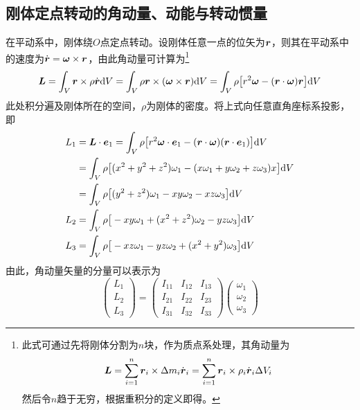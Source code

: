 \subsection{刚体定点转动的角动量、动能与转动惯量}

在平动系中，刚体绕$O$点定点转动。设刚体任意一点的位矢为$\boldsymbol{r}$，则其在平动系中的速度为$\dot{\boldsymbol{r}} = \boldsymbol{\omega} \times \boldsymbol{r}$，由此角动量可计算为\footnote{此式可通过先将刚体分割为$n$块，作为质点系处理，其角动量为\begin{equation*} \boldsymbol{L} = \sum_{i=1}^n \boldsymbol{r}_i \times \Delta m_i \dot{\boldsymbol{r}}_i = \sum_{i=1}^n \boldsymbol{r}_i \times \rho_i \dot{\boldsymbol{r}}_i \Delta V_i \end{equation*}然后令$n$趋于无穷，根据重积分的定义即得。}
\begin{align*}
	\boldsymbol{L} = \int_V \boldsymbol{r} \times \rho \dot{\boldsymbol{r}} \mathrm{d} V = \int_V \rho \boldsymbol{r} \times (\boldsymbol{\omega} \times \boldsymbol{r}) \mathrm{d} V = \int_V \rho \big[r^2 \boldsymbol{\omega} - (\boldsymbol{r} \cdot \boldsymbol{\omega}) \boldsymbol{r} \big] \mathrm{d} V
\end{align*}
此处积分遍及刚体所在的空间，$\rho$为刚体的密度。将上式向任意直角座标系投影，即
\begin{align*}
	L_1 & = \boldsymbol{L} \cdot \boldsymbol{e}_1 = \int_V \rho \big[r^2 \boldsymbol{\omega} \cdot \boldsymbol{e}_1 - (\boldsymbol{r} \cdot \boldsymbol{\omega}) (\boldsymbol{r} \cdot \boldsymbol{e}_1) \big] \mathrm{d} V \\
	& = \int_V \rho \big[(x^2+y^2+z^2) \omega_1 - (x \omega_1 + y\omega_2 + z\omega_3) x \big] \mathrm{d} V \\
	& = \int_V \rho \big[(y^2+z^2)\omega_1 - xy \omega_2 - xz \omega_3\big] \mathrm{d} V \\
	L_2 & = \int_V \rho \big[-xy \omega_1 + (x^2+z^2)\omega_2 - yz \omega_3\big] \mathrm{d} V \\
	L_3 & = \int_V \rho \big[-xz \omega_1 - yz \omega_2 + (x^2+y^2)\omega_3\big] \mathrm{d} V
\end{align*}
由此，角动量矢量的分量可以表示为
\begin{equation}
	\begin{pmatrix} L_1 \\ L_2 \\ L_3 \end{pmatrix} = \begin{pmatrix} I_{11} & I_{12} & I_{13} \\ I_{21} & I_{22} & I_{23} \\ I_{31} & I_{32} & I_{33} \end{pmatrix} \begin{pmatrix} \omega_1 \\ \omega_2 \\ \omega_3 \end{pmatrix}
\end{equation}

